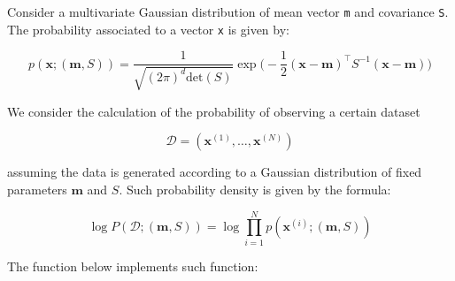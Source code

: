 \documentclass[11pt]{article}
\begin{document}
Consider a multivariate Gaussian distribution of mean vector \texttt{m}
and covariance \texttt{S}. The probability associated to a vector
\texttt{x} is given by:

\[
p(\boldsymbol{x};(\boldsymbol{m},S)) = \frac{1}{\sqrt{(2\pi)^d \mathrm{det}(S)}} \exp \Big( - \frac12 (\boldsymbol{x}-\boldsymbol{m})^\top S^{-1} (\boldsymbol{x}-\boldsymbol{m})\Big)
\]

We consider the calculation of the probability of observing a certain
dataset

\[
\mathcal{D} = (\boldsymbol{x}^{(1)},\dots,\boldsymbol{x}^{(N)})
\]

assuming the data is generated according to a Gaussian distribution of
fixed parameters \(\boldsymbol{m}\) and \(S\). Such probability density
is given by the formula:

\[
\log P(\mathcal{D};(\boldsymbol{m},S)) = \log \prod_{i=1}^N p(\boldsymbol{x}^{(i)};(\boldsymbol{m},S))
\]

The function below implements such function:
\end{document}
